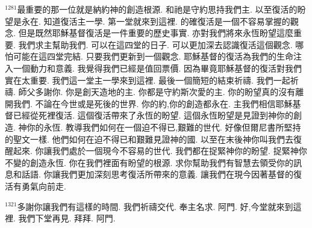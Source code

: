 \documentclass{book}
\begin{document}
$^{1281}$最重要的那一位就是納約神的創造根源.
和祂是守約思持我們主.
以至復活的盼望是永在.
知道復活主一學.
第一堂就來到這裡.
的確復活是一個不容易掌握的觀念.
但是既然耶穌基督復活是一件重要的歷史事實.
亦對我們將來永恆盼望這麼重要.
我們求主幫助我們.
可以在這四堂的日子.
可以更加深去認識復活這個觀念.
哪怕可能在這四堂完結.
只要我們更新到一個觀念.
耶穌基督的復活為我們的生命注入一個動力和意義.
我覺得我們已經是值回票價.
因為畢竟耶穌基督的復活對我們實在太重要.
我們這一堂主一學來到這裡.
最後一個簡短的結束祈禱.
我們一起祈禱.
師父多謝你.
你是創天造地的主.
你都是守約斯次愛的主.
你的盼望真的沒有離開我們.
不論在今世或是死後的世界.
你的約,你的創造都永在.
主我們相信耶穌基督已經從死裡復活.
這個復活帶來了永恆的盼望.
這個永恆盼望是見證到神你的創造.
神你的永恆.
教導我們如何在一個迫不得已,艱難的世代.
好像但爾尼書所堅持的聖文一樣.
他們如何在迫不得已和艱難見證神的國.
以至在末後神你叫我們去復醒起來.
你讓我們處於一個現今不容易的世代.
我們都在捉緊神你的盼望.
捉緊神你不變的創造永恆.
你在我們裡面有盼望的根源.
求你幫助我們有智慧去領受你的訊息和話語.
你讓我們更加深刻思考復活所帶來的意義.
讓我們在現今因著基督的復活有勇氣向前走.

$^{1321}$多謝你讓我們有這樣的時間.
我們祈禱交代.
奉主名求.
阿門.
好,今堂就來到這裡.
我們下堂再見.
拜拜.
阿門.
\newpage
\end{document}
